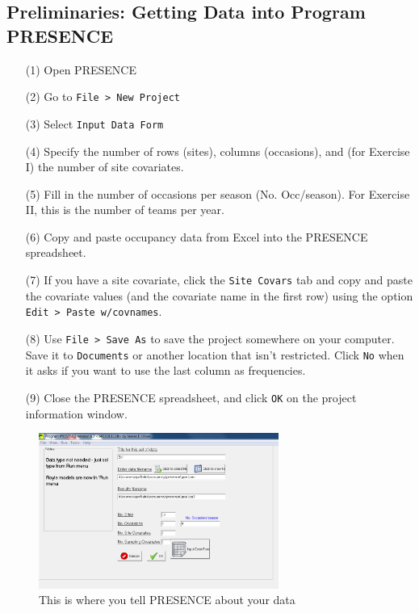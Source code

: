 \documentclass[12pt]{article}\usepackage[]{graphicx}\usepackage[]{color}
\begin{document}
\subsection*{\normalsize Preliminaries: Getting Data into Program PRESENCE}
\vspace{-10pt}
\begin{enumerate}
  \itemsep-6pt
  \item[(1)]  Open PRESENCE
  \item[(2)]  Go to \texttt{File > New Project}
  \item[(3)]  Select \texttt{Input Data Form}
  \item[(4)]  Specify the number of rows (sites), columns
    (occasions), and (for Exercise I) the number of site covariates. 
  \item[(5)]  Fill in the number of occasions per season
    (No. Occ/season). For Exercise II, this is the number of teams per
    year. 
  \item[(6)]  Copy and paste occupancy data from Excel into the
    PRESENCE spreadsheet. 
  \item[(7)]  If you have a site covariate, click the \texttt{Site
      Covars} tab and copy and paste the covariate values (and the
    covariate name in the first row) using the option \texttt{Edit > Paste
    w/covnames}.  
  \item[(8)]  Use \texttt{File > Save As} to save the project
    somewhere on your computer. Save it to \texttt{Documents} or
    another location that isn't restricted. Click \texttt{No} when it
    asks if you want to use the last column as frequencies. 
  \item[(9)]  Close the PRESENCE spreadsheet, and click \texttt{OK} on
    the project information window.  
\end{enumerate}


\begin{figure}[h!]
  \centering
  \includegraphics[width=0.7\textwidth]{figs/pres-setup}
  \caption{\small This is where you tell PRESENCE about your data}
  \label{fig:pres-setup}
\end{figure}
\end{document}
